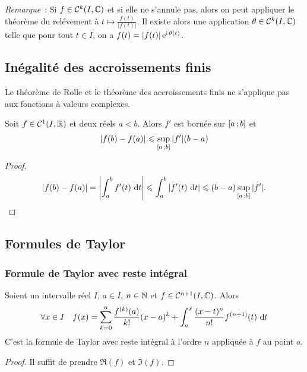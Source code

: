\emph{Remarque}~: Si \(f \in \mathcal{C}^{k}(I,\mathbb{C})\) et si elle ne s'annule pas, 
alors on peut appliquer le théorème du relévement à \(t \longmapsto 
\frac{f(t)}{|f(t)|}\). Il existe alors une application \(\theta \in 
\mathcal{C}^{k}(I,\mathbb{C})\) telle que pour tout \(t \in I\), on a \(f(t) = |f(t)|\operatorname{e}^{\operatorname{i} 
\theta(t)}\).

\subsection{Inégalité des accroissements finis}

\danger Le théorème de Rolle et le théorème des accroissements finis ne 
s'applique pas aux fonctions à valeurs complexes.

\begin{prop}
  Soit \(f \in \mathcal{C}^{1}(I,\mathbb{R})\) et deux réels \(a<b\). Alors \(f'\) est bornée 
  sur \(\left[ a \, ; {} b \right]\) et
  \begin{equation}
    |f(b)-f(a)| \leqslant \sup\limits_{\left[ a \, ; {} b \right]}|f'|(b-a)
  \end{equation}
\end{prop}
\begin{proof}
  \begin{equation}
    |f(b)-f(a)| = \left|\int_a^b f'(t)\,\mathop{}\mathopen{}\mathrm{d} t\right| \leqslant \int_a^b 
    |f'(t)\,\mathop{}\mathopen{}\mathrm{d} t| \leqslant (b-a) \sup\limits_{\left[ a \, ; {} b \right]}|f'|.
  \end{equation}
\end{proof}

\subsection{Formules de Taylor}

\subsubsection{Formule de Taylor avec reste intégral}

\begin{theo}
  Soient un intervalle réel \(I\), \(a \in I\), \(n \in \mathbb{N}\) et \(f \in 
  \mathcal{C}^{{n+1}}(I,\mathbb{C})\). Alors
  \begin{equation}
    \forall x \in I \quad f(x) = \sum_{k = 0}^n \frac{f^{(k)}(a)}{k!}(x-a)^k + 
    \int_a^x \frac{(x-t)^n}{n!} f^{(n+1)}(t)\,\mathop{}\mathopen{}\mathrm{d} t
  \end{equation}
  C'est la formule de Taylor avec reste intégral à l'ordre \(n\) appliquée à 
  \(f\) au point \(a\).
\end{theo}
\begin{proof}
  Il suffit de prendre \(\Re(f)\) et \(\Im(f)\).
\end{proof}

